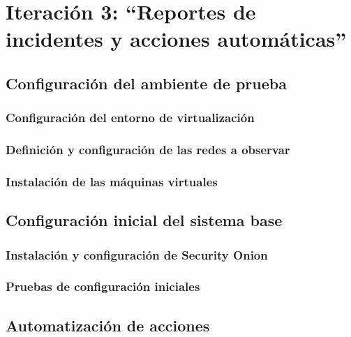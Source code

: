 \chapter{Iteración 3: “Reportes de incidentes y acciones automáticas”}
    \section{Configuración del ambiente de prueba}
        \subsection{Configuración del entorno de virtualización}
        \subsection{Definición y configuración de las redes a observar}
    \subsection{Instalación de las máquinas virtuales}
        \section{Configuración inicial del sistema base}
        \subsection{Instalación y configuración de Security Onion}
    \subsection{Pruebas de configuración iniciales}
    \section{Automatización de acciones}